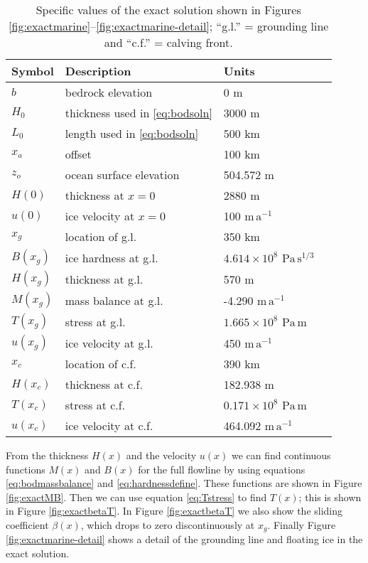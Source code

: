 \documentclass[review,letterpaper]{igs}
\begin{document}
\begin{table}
\caption{Specific values of the exact solution shown in Figures \ref{fig:exactmarine}--\ref{fig:exactmarine-detail}; ``g.l.'' = grounding line and ``c.f.'' = calving front.}\label{tab:exactsoln}

\medskip
\begin{tabular}{llll}
Symbol & Description & Units \\ \hline
$b$ & bedrock elevation & 0 m \\
$H_0$ & thickness used in \eqref{eq:bodsoln} & 3000 m  \\
$L_0$ & length used in \eqref{eq:bodsoln} & 500 km  \\
$x_a$ & offset & 100 km  \\
$z_o$ & ocean surface elevation & 504.572 m \\ \hline
$H(0)$ & thickness at $x=0$ & 2880 m  \\
$u(0)$ & ice velocity at $x=0$ & 100 $\text{m}\,\text{a}^{-1}$  \\ \hline
$x_g$ & location of g.l. & 350 km  \\
$B(x_g)$ & ice hardness at g.l. & $4.614 \times 10^{8}$ $\text{Pa}\,\text{s}^{1/3}$  \\
$H(x_g)$ & thickness at g.l. & 570 m  \\
$M(x_g)$ & mass balance at g.l. & -4.290 $\text{m}\,\text{a}^{-1}$  \\
$T(x_g)$ & stress at g.l. & $1.665 \times 10^{8}$ $\text{Pa}\,\text{m}$  \\
$u(x_g)$ & ice velocity at g.l. & 450 $\text{m}\,\text{a}^{-1}$  \\ \hline
$x_c$ & location of c.f. & 390 km  \\
$H(x_c)$ & thickness at c.f. & 182.938 m  \\
$T(x_c)$ & stress at c.f. & $0.171 \times 10^{8}$ $\text{Pa}\,\text{m}$  \\
$u(x_c)$ & ice velocity at c.f. & 464.092 $\text{m}\,\text{a}^{-1}$  \\
\end{tabular}
\end{table}

From the thickness $H(x)$ and the velocity $u(x)$ we can find continuous functions $M(x)$ and $B(x)$ for the full  flowline by using equations \eqref{eq:bodmassbalance} and \eqref{eq:hardnessdefine}.  These functions are shown in Figure \ref{fig:exactMB}.  Then we can use equation \eqref{eq:Tstress} to find $T(x)$; this is shown in Figure \ref{fig:exactbetaT}.  In Figure \ref{fig:exactbetaT} we also show the sliding coefficient $\beta(x)$, which drops to zero discontinuously at $x_g$.  Finally Figure \ref{fig:exactmarine-detail} shows a detail of the grounding line and floating ice in the exact solution.
\end{document}
